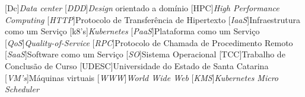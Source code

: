 \pretextualchapter{\listadesiglasname}
\begin{acronym}
    \large
	[Dc]{\it Data center}
	[\textit{DDD}]{\textit{Design} orientado a domínio}
	[HPC]{\textit{High Performance Computing}}
	[\textit{HTTP}]{Protocolo de Transferência de Hipertexto}
	[\textit{IaaS}]{Infraestrutura como um Serviço}
	[k8's]{\textit{Kubernetes}}
	[\textit{PaaS}]{Plataforma como um Serviço}
	[\textit{QoS}]{\textit{Quality-of-Service}}
	[\textit{RPC}]{Protocolo de Chamada de Procedimento Remoto}
	[\textit{SaaS}]{Software como um Serviço}
	[\textit{SO}]{Sistema Operacional}
	[TCC]{Trabalho de Conclusão de Curso}
	[UDESC]{Universidade do Estado de Santa Catarina}
	[\textit{VM's}]{Máquinas virtuais}
	[\textit{WWW}]{\textit{World Wide Web}}
	[\textit{KMS}]{\textit{Kubernetes Micro Scheduler}}
\end{acronym}
\cleardoublepage
